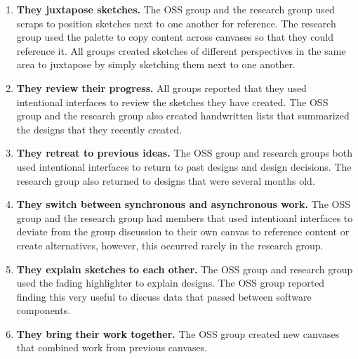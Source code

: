 \begin{enumerate}
	\item \textbf{They juxtapose sketches.} The OSS group and the research group used scraps to position sketches next to one another for reference. The research group used the palette to copy content across canvases so that they could reference it. All groups created sketches of different perspectives in the same area to juxtapose by simply sketching them next to one another.
	\item \textbf{They review their progress.} All groups reported that they used intentional interfaces to review the sketches they have created. The OSS group and the research group also created handwritten lists that summarized the designs that they recently created.
	\item \textbf{They retreat to previous ideas.} The OSS group and research groups both used intentional interfaces to return to past designs and design decisions. The research group also returned to designs that were several months old.
	\item \textbf{They switch between synchronous and asynchronous work.} The OSS group and the research group had members that used intentioanl interfaces to deviate from the group discussion to their own canvas to reference content or create alternatives, however, this occurred rarely in the research group. 
	\item \textbf{They explain sketches to each other.} The OSS group and research group used the fading highlighter to explain designs. The OSS group reported finding this very useful to discuss data that passed between software components. 
	\item \textbf{They bring their work together.} The OSS group created new canvases that combined work from previous canvases.
\end{enumerate}


